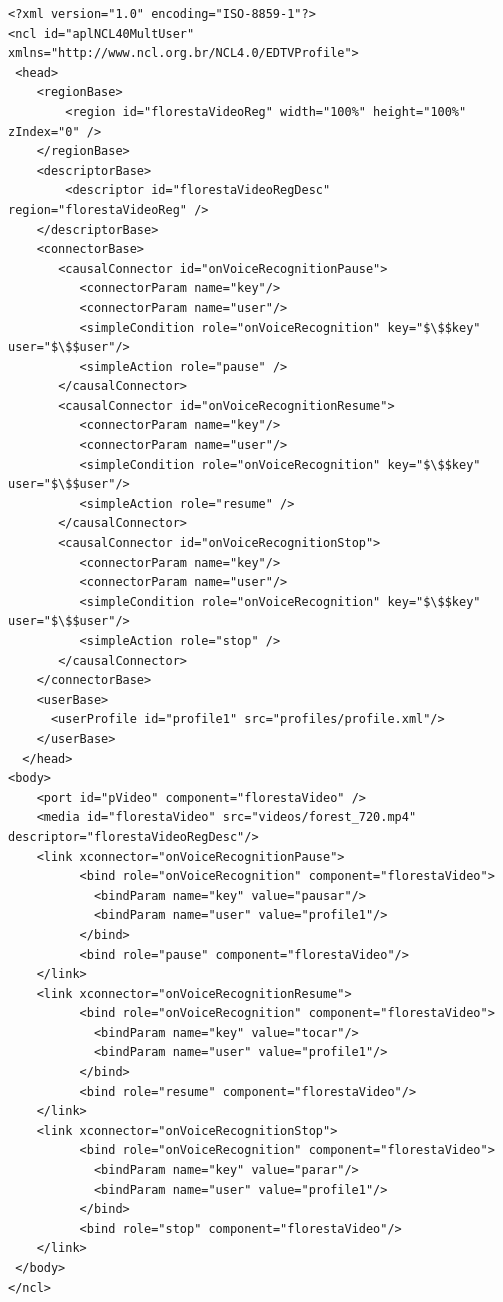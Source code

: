 \begin{lstlisting}[language=ncl,label=lst:appIdMultUser, caption={Código da aplicação NCL com identificação multiusuário.}]
<?xml version="1.0" encoding="ISO-8859-1"?>
<ncl id="aplNCL40MultUser" xmlns="http://www.ncl.org.br/NCL4.0/EDTVProfile">
 <head>
	<regionBase>
		<region id="florestaVideoReg" width="100%" height="100%" zIndex="0" />
	</regionBase>
	<descriptorBase>
	    <descriptor id="florestaVideoRegDesc"  region="florestaVideoReg" />
	</descriptorBase>
	<connectorBase>
       <causalConnector id="onVoiceRecognitionPause">
          <connectorParam name="key"/>
          <connectorParam name="user"/>      
          <simpleCondition role="onVoiceRecognition" key="$\$$key" user="$\$$user"/>
          <simpleAction role="pause" />
       </causalConnector>  
       <causalConnector id="onVoiceRecognitionResume">
          <connectorParam name="key"/>
          <connectorParam name="user"/>      
          <simpleCondition role="onVoiceRecognition" key="$\$$key" user="$\$$user"/>
          <simpleAction role="resume" />
       </causalConnector>  
       <causalConnector id="onVoiceRecognitionStop">
          <connectorParam name="key"/>
          <connectorParam name="user"/>      
          <simpleCondition role="onVoiceRecognition" key="$\$$key" user="$\$$user"/>
          <simpleAction role="stop" />
       </causalConnector>  
	</connectorBase>
    <userBase>
      <userProfile id="profile1" src="profiles/profile.xml"/>
    </userBase>
  </head>
<body>
	<port id="pVideo" component="florestaVideo" />
	<media id="florestaVideo" src="videos/forest_720.mp4" descriptor="florestaVideoRegDesc"/>
    <link xconnector="onVoiceRecognitionPause">
          <bind role="onVoiceRecognition" component="florestaVideo">
            <bindParam name="key" value="pausar"/>
            <bindParam name="user" value="profile1"/>
          </bind>
          <bind role="pause" component="florestaVideo"/>
    </link> 
    <link xconnector="onVoiceRecognitionResume">
          <bind role="onVoiceRecognition" component="florestaVideo">
            <bindParam name="key" value="tocar"/>
            <bindParam name="user" value="profile1"/>            
          </bind>
          <bind role="resume" component="florestaVideo"/>
    </link> 
    <link xconnector="onVoiceRecognitionStop">
          <bind role="onVoiceRecognition" component="florestaVideo">
            <bindParam name="key" value="parar"/>
            <bindParam name="user" value="profile1"/>            
          </bind>
          <bind role="stop" component="florestaVideo"/>
    </link> 
 </body>
</ncl>
\end{lstlisting}

